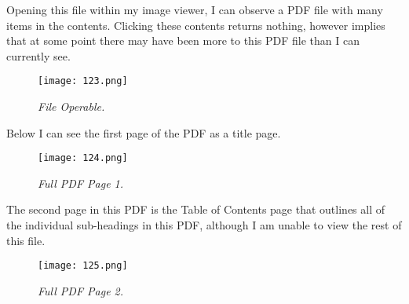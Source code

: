 Opening this file within my image viewer, I can observe a PDF file with many items in the contents. Clicking these contents returns nothing, however implies that at some point there may have been more to this PDF file than I can currently see.

\begin{figure}[H]
    \setlength{\abovecaptionskip}{20pt}
    \setlength{\belowcaptionskip}{0pt}
    \centering
    \texttt{[image: 123.png]}
    \captionsetup{justification=centering}
    \caption{\textit{File Operable.}}
    \label{fig:123}
\end{figure}
\vspace{-10pt}

Below I can see the first page of the PDF as a title page.

\begin{figure}[H]
    \setlength{\abovecaptionskip}{20pt}
    \setlength{\belowcaptionskip}{0pt}
    \centering
    \texttt{[image: 124.png]}
    \captionsetup{justification=centering}
    \caption{\textit{Full PDF Page 1.}}
    \label{fig:124}
\end{figure}
\vspace{-10pt}

The second page in this PDF is the Table of Contents page that outlines all of the individual sub-headings in this PDF, although I am unable to view the rest of this file.

\begin{figure}[H]
    \setlength{\abovecaptionskip}{20pt}
    \setlength{\belowcaptionskip}{0pt}
    \centering
    \texttt{[image: 125.png]}
    \captionsetup{justification=centering}
    \caption{\textit{Full PDF Page 2.}}
    \label{fig:125}
\end{figure}
\vspace{-10pt}